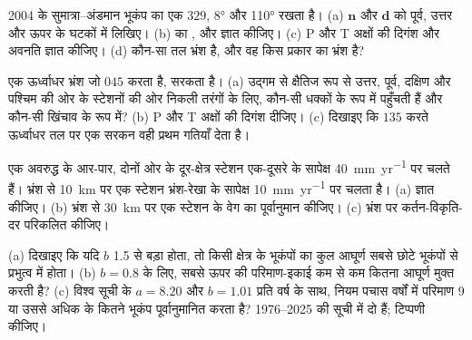 \begin{exercise}[$\star\star$]
\label{exo:b1:earthquake-source:7}
2004 के सुमात्रा–अंडमान भूकंप का एक   $329$,  \ang{8} और  \ang{110} रखता है। (a) $\mathbf n$ और $\mathbf d$ को पूर्व, उत्तर और ऊपर के घटकों में लिखिए। (b)  का ,  और  ज्ञात कीजिए। (c) P और T अक्षों की दिगंश और अवनति ज्ञात कीजिए। (d) कौन-सा तल भ्रंश है, और वह किस प्रकार का भ्रंश है?
\end{exercise}

\begin{exercise}[$\star\star$]
\label{exo:b1:earthquake-source:8}
एक ऊर्ध्वाधर भ्रंश जो $045$  करता है,  सरकता है। (a) उद्गम से क्षैतिज रूप से उत्तर, पूर्व, दक्षिण और पश्चिम की ओर के स्टेशनों की ओर निकली तरंगों के लिए, कौन-सी धक्कों के रूप में पहुँचती हैं और कौन-सी खिंचाव के रूप में? (b) P और T अक्षों की दिगंश दीजिए। (c) दिखाइए कि $135$  करते ऊर्ध्वाधर तल पर एक  सरकन वही प्रथम गतियाँ देता है।
\end{exercise}

\begin{exercise}[$\star\star$]
\label{exo:b1:earthquake-source:9}
एक अवरुद्ध  के आर-पार, दोनों ओर के दूर-क्षेत्र स्टेशन एक-दूसरे के सापेक्ष \qty{40}{mm.yr^{-1}} पर चलते हैं। भ्रंश से \qty{10}{km} पर एक स्टेशन भ्रंश-रेखा के सापेक्ष \qty{10}{mm.yr^{-1}} पर चलता है। (a)  ज्ञात कीजिए। (b) भ्रंश से \qty{30}{km} पर एक स्टेशन के वेग का पूर्वानुमान कीजिए। (c) भ्रंश पर कर्तन-विकृति-दर परिकलित कीजिए।
\end{exercise}

\begin{exercise}[$\star\star\star$]
\label{exo:b1:earthquake-source:10}
(a) दिखाइए कि यदि $b$ 1.5 से बड़ा होता, तो किसी क्षेत्र के भूकंपों का कुल आघूर्ण सबसे छोटे भूकंपों से प्रभुत्व में होता। (b) $b = 0.8$ के लिए, सबसे ऊपर की परिमाण-इकाई कम से कम कितना आघूर्ण मुक्त करती है? (c) विश्व सूची के $a = 8.20$ और $b = 1.01$ प्रति वर्ष के साथ, नियम पचास वर्षों में परिमाण 9 या उससे अधिक के कितने भूकंप पूर्वानुमानित करता है? 1976–2025 की सूची में दो हैं; टिप्पणी कीजिए।
\end{exercise}

